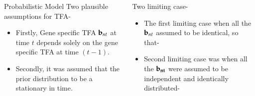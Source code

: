 \documentclass[serif,mathserif,final]{beamer}
\begin{document}
\begin{frame}{}
\begin{columns}[t]
\begin{column}{0.24\linewidth}
\begin{block}{Probabilistic Model}
	Two plausible assumptions for TFA-
	\begin{itemize}
	\item Firstly, Gene specific TFA $ \bold{b}_{nt} $ at time $ t $ depends solely on the gene specific TFA at time $ (t-1) $. 
	\item Secondly, it was assumed that the prior distribution to be a stationary in time. \\~\\
	\end {itemize}
      
      \end{block}

      \end{column}%


    
    
    \begin{column}{0.24\linewidth}

      \begin{block}{}

	Two limiting case-
	\begin{itemize}
	\item The first limiting case when all the $ \bold{b}_{nt} $ assumed to be identical, so that- \\
	\raggedright
	\item Second limiting case was when all the $ \bold{ b_{nt}} $ were assumed to be independent and identically distributed- \\ 

	\end{itemize}
      

\end{block}
\end{column}
\end{columns}
\end{frame}
\end{document}
